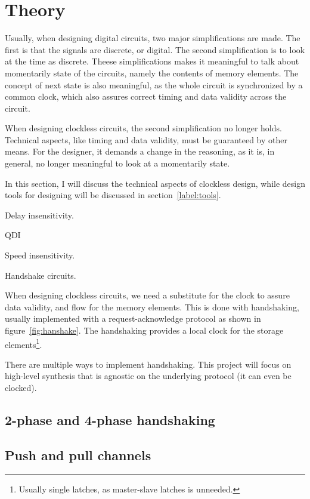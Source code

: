 \section{Theory}

Usually, when designing digital circuits, two major simplifications
are made. The first is that the signals are discrete, or digital. The
second simplification is to look at the time as discrete. Theese
simplifications makes it meaningful to talk about momentarily state of
the circuits, namely the contents of memory elements. The concept of
next state is also meaningful, as the whole circuit is synchronized by
a common clock, which also assures correct timing and data validity
across the circuit.

When designing clockless circuits, the second simplification no longer
holds. Technical aspects, like timing and data validity, must be
guaranteed by other means. For the designer, it demands a change in
the reasoning, as it is, in general, no longer meaningful to look at a
momentarily state.

In this section, I will discuss the technical aspects of clockless
design, while design tools for designing will be discussed in
section~\ref{label:tools}.

Delay insensitivity.

QDI

Speed insensitivity.

Handshake circuits.

When designing clockless circuits, we need a substitute for the clock
to assure data validity, and flow for the memory elements. This is
done with handshaking, usually implemented with a request-acknowledge
protocol as shown in figure~\ref{fig:hanshake}. The handshaking
provides a local clock for the storage elements\footnote{Usually
  single latches, as master-slave latches is unneeded.}.

There are multiple ways to implement handshaking. This project will
focus on high-level synthesis that is agnostic on the underlying
protocol (it can even be clocked). 

\subsection{2-phase and 4-phase handshaking}


\subsection{Push and pull channels}

